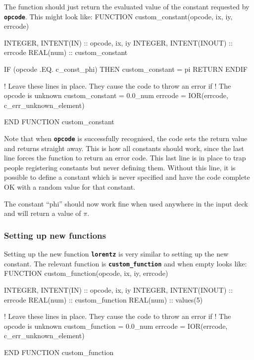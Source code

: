 \documentclass[12pt,a4paper]{article}
\newcommand{\inlinecode}[1]{{\color{warwickred} \bf\texttt{#1}}}
\newenvironment{boxverbatim}{\lboxverbatim{none}}{\endlboxverbatim}
\begin{document}
The function should just return the evaluated value of the constant requested
by \inlinecode{opcode}. This might look like:
\begin{boxverbatim}
FUNCTION custom_constant(opcode, ix, iy, errcode)

  INTEGER, INTENT(IN) :: opcode, ix, iy
  INTEGER, INTENT(INOUT) :: errcode
  REAL(num) :: custom_constant

  IF (opcode .EQ. c_const_phi) THEN
    custom_constant = pi
    RETURN
  ENDIF

  ! Leave these lines in place. They cause the code to throw an error if
  ! The opcode is unknown
  custom_constant = 0.0_num
  errcode = IOR(errcode, c_err_unknown_element)

END FUNCTION custom_constant
\end{boxverbatim}

Note that when \inlinecode{opcode} is successfully recognised, the code sets
the return value and returns straight away. This is how all constants should
work, since the last line forces the function to return an error code. This
last line is in place to trap people registering constants but never defining
them. Without this line, it is possible to define a constant which is
never specified and have the code complete OK with a random value for that
constant.

The constant ``phi'' should now work fine when used anywhere in the input deck
and will return a value of $\pi$.

\subsubsection{Setting up new functions}

Setting up the new function \inlinecode{lorentz} is very similar to setting up
the new constant. The relevant function is \inlinecode{custom\_function} and
when empty looks like:
\begin{boxverbatim}
FUNCTION custom_function(opcode, ix, iy, errcode)

  INTEGER, INTENT(IN) :: opcode, ix, iy
  INTEGER, INTENT(INOUT) :: errcode
  REAL(num) :: custom_function
  REAL(num) :: values(5)

  ! Leave these lines in place. They cause the code to throw an error if
  ! The opcode is unknown
  custom_function = 0.0_num
  errcode = IOR(errcode, c_err_unknown_element)

END FUNCTION custom_function
\end{boxverbatim}
\end{document}
